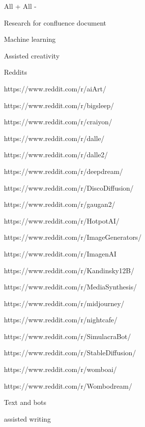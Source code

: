 {All +} {All -}

Research for confluence document

 
\tightlist
 
  Machine learning

   
  \tightlist
   
    Assisted creativity

     
    \tightlist
     
     
      Reddits

       
      \tightlist
       
        https://www.reddit.com/r/aiArt/
       
        https://www.reddit.com/r/bigsleep/
       
        https://www.reddit.com/r/craiyon/
       
        https://www.reddit.com/r/dalle/
       
        https://www.reddit.com/r/dalle2/
       
        https://www.reddit.com/r/deepdream/
       
        https://www.reddit.com/r/DiscoDiffusion/
       
        https://www.reddit.com/r/gaugan2/
       
        https://www.reddit.com/r/HotpotAI/
       
        https://www.reddit.com/r/ImageGenerators/
       
        https://www.reddit.com/r/ImagenAI
       
        https://www.reddit.com/r/Kandinsky12B/
       
        https://www.reddit.com/r/MediaSynthesis/
       
        https://www.reddit.com/r/midjourney/
       
        https://www.reddit.com/r/nightcafe/
       
        https://www.reddit.com/r/SimulacraBot/
       
        https://www.reddit.com/r/StableDiffusion/
       
        https://www.reddit.com/r/womboai/
       
        https://www.reddit.com/r/Wombodream/
       
     
      Text and bots

       
      \tightlist
       
        assisted writing

         
        \tightlist
         
